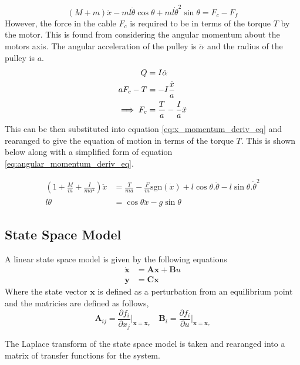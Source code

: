 \documentclass{article}
\begin{document}
\begin{equation}
  (M+m)\ddot{x} - ml\ddot{\theta}\cos\theta + ml\dot{\theta}^2\sin\theta = F_c - F_f
  \label{eq:x_momentum_deriv_eq}
\end{equation}
However, the force in the cable $F_c$ is required to be in terms of the torque $T$ by the motor.
This is found from considering the angular momentum about the motors axis. The angular acceleration of the pulley is $\ddot{\alpha}$ and the radius of the pulley is $a$.
\begin{align}
  Q &= I\ddot{\alpha} \notag \\
  aF_c - T &= -I\frac{\ddot{x}}{a} \notag \\
  \implies F_c &= \frac{T}{a} - \frac{I}{a}\ddot{x}
\end{align}
This can be then substituted into equation \ref{eq:x_momentum_deriv_eq} and rearanged to give the equation of motion in terms of the torque $T$.
This is shown below along with a simplified form of equation \ref{eq:angular_momentum_deriv_eq}.

\begin{align}
  \left( 1 + \frac{M}{m} + \frac{I}{ma^2} \right) \ddot{x} &= \frac{T}{ma} - \frac{F}{m}\text{sgn}(\dot{x}) + l\cos\theta . \ddot{\theta} - l\sin\theta . \dot{\theta}^2 \label{eq:motion_1} \\
  l \ddot{\theta} &= \cos\theta \ddot{x} - g\sin\theta \label{eq:motion_2}
\end{align}

\subsection{State Space Model}

A linear state space model is given by the following equations
\begin{align}
  \mathbf{\dot{x}} &= \mathbf{Ax} + \mathbf{B}u \\
  \mathbf{y} &= \mathbf{Cx}
\end{align}
Where the state vector $\mathbf{x}$ is defined as a perturbation from an equilibrium point and the matricies are defined as follows,
\begin{equation}
  \mathbf{A}_{ij} = \frac{\partial f_i}{\partial x_j} \Bigr|_{\mathbf{x}=\mathbf{x}_e} \quad \mathbf{B}_{i} = \frac{\partial f_i}{\partial u} \Bigr|_{\mathbf{x}=\mathbf{x}_e}
\end{equation}

The Laplace transform of the state space model is taken and rearanged into a matrix of transfer functions for the system.
\end{document}
